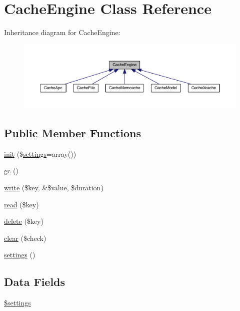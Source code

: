 \hypertarget{class_cache_engine}{\section{Cache\-Engine Class Reference}
\label{class_cache_engine}
}


Inheritance diagram for Cache\-Engine\-:
\nopagebreak
\begin{figure}[H]
\begin{center}
\leavevmode
\includegraphics[width=350pt]{class_cache_engine__inherit__graph}
\end{center}
\end{figure}
\subsection*{Public Member Functions}
\begin{DoxyCompactItemize}
\item 
\hyperlink{class_cache_engine_add47463221d657541f10f2ca5ec218d8}{init} (\$\hyperlink{class_cache_engine_ad7354383714c6ae99d6ee1bfb95ab49f}{settings}=array())
\item 
\hyperlink{class_cache_engine_a14ff7ef4b198ff14884dd8c564264ca3}{gc} ()
\item 
\hyperlink{class_cache_engine_a0e72b4e1d3c5ff461155883cad18358d}{write} (\$key, \&\$value, \$duration)
\item 
\hyperlink{class_cache_engine_a4c50c958c469c08bba0c0ccb710ca8af}{read} (\$key)
\item 
\hyperlink{class_cache_engine_aa74a2edd6f3cbb5c5353f7faa97b6d70}{delete} (\$key)
\item 
\hyperlink{class_cache_engine_a25e4cc07f5ba4a55b97a26734f71eac6}{clear} (\$check)
\item 
\hyperlink{class_cache_engine_ad7354383714c6ae99d6ee1bfb95ab49f}{settings} ()
\end{DoxyCompactItemize}
\subsection*{Data Fields}
\begin{DoxyCompactItemize}
\item 
\hyperlink{class_cache_engine_ac7c3353107070daa85f641882931b358}{\$settings}
\end{DoxyCompactItemize}


